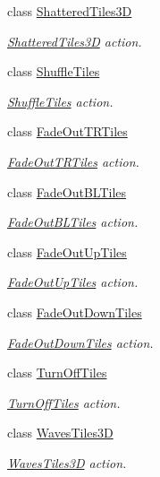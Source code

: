 \begin{DoxyCompactItemize}
class \hyperlink{classShatteredTiles3D}{Shattered\+Tiles3D}
\begin{DoxyCompactList}\small\item\em \hyperlink{classShatteredTiles3D}{Shattered\+Tiles3D} action. \end{DoxyCompactList}\item 
class \hyperlink{classShuffleTiles}{Shuffle\+Tiles}
\begin{DoxyCompactList}\small\item\em \hyperlink{classShuffleTiles}{Shuffle\+Tiles} action. \end{DoxyCompactList}\item 
class \hyperlink{classFadeOutTRTiles}{Fade\+Out\+T\+R\+Tiles}
\begin{DoxyCompactList}\small\item\em \hyperlink{classFadeOutTRTiles}{Fade\+Out\+T\+R\+Tiles} action. \end{DoxyCompactList}\item 
class \hyperlink{classFadeOutBLTiles}{Fade\+Out\+B\+L\+Tiles}
\begin{DoxyCompactList}\small\item\em \hyperlink{classFadeOutBLTiles}{Fade\+Out\+B\+L\+Tiles} action. \end{DoxyCompactList}\item 
class \hyperlink{classFadeOutUpTiles}{Fade\+Out\+Up\+Tiles}
\begin{DoxyCompactList}\small\item\em \hyperlink{classFadeOutUpTiles}{Fade\+Out\+Up\+Tiles} action. \end{DoxyCompactList}\item 
class \hyperlink{classFadeOutDownTiles}{Fade\+Out\+Down\+Tiles}
\begin{DoxyCompactList}\small\item\em \hyperlink{classFadeOutDownTiles}{Fade\+Out\+Down\+Tiles} action. \end{DoxyCompactList}\item 
class \hyperlink{classTurnOffTiles}{Turn\+Off\+Tiles}
\begin{DoxyCompactList}\small\item\em \hyperlink{classTurnOffTiles}{Turn\+Off\+Tiles} action. \end{DoxyCompactList}\item 
class \hyperlink{classWavesTiles3D}{Waves\+Tiles3D}
\begin{DoxyCompactList}\small\item\em \hyperlink{classWavesTiles3D}{Waves\+Tiles3D} action. \end{DoxyCompactList}\item 

\end{DoxyCompactItemize}

